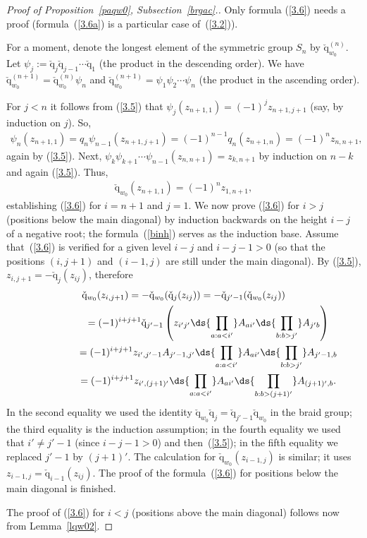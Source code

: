 \documentclass[pdftex]{sigma}
\def\nplus{\mathfrak{n}}\def\nn{\nonumber}\def\nin{\noindent}
\def\q{\check{\mathrm q}}\def\Q{\mathrm{Q}}\def\r#1{(\ref{#1})}\let\rf=\r
\def\s{z}\def\S{\mathrm {S}}\def\si{\sigma}\def\Sp{\S^{\nplus}}\def\sy{\acute{\sigma}}\def\th{\mathring{h}}
\def\tphi{A}\def\tpsi{A'}\def\tphiplus{B}\def\tpsiminus{B'}\def\ttphi{B}\def\ttpsi{B'}\def\ts{\hskip1pt}\def\tts{\hskip.5pt}
\numberwithin{equation}{section}
\begin{document}
\begin{proof}[Proof  of Proposition~\ref{paqw0}, Subsection~\ref{brgac}.] %
Only formula \rf{3.6} needs a proof (formula~\rf{3.6a}
is a particular case of~\rf{3.2}).


For a moment, denote the longest element
of the symmetric group $S_n$ by $\q_{w_0}^{(n)}$. Let $\psi_j:=\q_j\q_{j-1}\cdots\q_1$ (the product in the descending order).
We have $\q_{w_0}^{(n+1)}=\q_{w_0}^{(n)}\psi_n$ and  $\q_{w_0}^{(n+1)}=\psi_1\psi_2\cdots\psi_n$ (the product in the
ascending order).


For $j<n$ it follows from \rf{3.5} that $\psi_j (\s_{n+1,1})=(-1)^j\s_{n+1,j+1}$ (say, by induction on $j$). So,
\begin{gather*}\psi_n(\s_{n+1,1})=q_n\psi_{n-1} (\s_{n+1,j+1})=(-1)^{n-1}q_n(\s_{n+1,n})=(-1)^{n}\s_{n,n+1}  ,\end{gather*}
again by \rf{3.5}. Next, $\psi_k\psi_{k+1}\cdots\psi_{n-1}(\s_{n,n+1})=\s_{k,n+1}$ by induction on $n-k$ and
again \rf{3.5}. Thus,
\begin{gather}\label{binh}
\q_{w_0}(\s_{n+1,1})=(-1)^n \s_{1,n+1} ,
\end{gather}
establishing \rf{3.6} for $i=n+1$ and $j=1$. We now prove \rf{3.6} for $i>j$ (positions below the main diagonal) by induction backwards
on the height $i-j$ of a negative root;  the formula~\rf{binh} serves as the induction base. Assume that~\rf{3.6}
is verif\/ied for a given level $i-j$ and $i-j-1>0$ (so that the positions $(i,j+1)$ and $(i-1,j)$ are still under the main
diagonal). By \rf{3.5}, $\s_{i,j+1}=-\q_j(\s_{ij})$, therefore
\begin{gather*}\q_{w_0}(\s_{i,j+1}) = -\q_{w_0}(\q_j(\s_{ij}))=-\q_{j'-1}(\q_{w_0}(\s_{ij})) \\
\phantom{\q_{w_0}(\s_{i,j+1})}{}  = (-1)^{i+j+1} \q_{j'-1}\left(\s_{i'j'}\ds{\prod_{a:a<i'}}\tphi_{ai'}  \ds{\prod_{b:b>j'}}\tphi_{j'b}\right)\\
\phantom{\q_{w_0}(\s_{i,j+1})}{} = (-1)^{i+j+1}\s_{i',j'-1}\tphi_{j'-1,j'}\ds{\prod_{a:a<i'}}\tphi_{ai'}  \ds{\prod_{b:b>j'}}\tphi_{j'-1,b}\\
\phantom{\q_{w_0}(\s_{i,j+1})}{} = (-1)^{i+j+1}\s_{i',(j+1)'}\ds{\prod_{a:a<i'}}\tphi_{ai'}\ds{\prod_{b:b>(j+1)'}}\tphi_{(j+1)',b}  .
\end{gather*}
In the second equality we used the identity $\q_{w_0}\q_j=\q_{j'-1}\q_{w_0}$ in the braid group; the third equality is the
induction assumption; in the fourth equality we used that $i'\neq j'-1$ (since $i-j-1>0$) and then~\rf{3.5}; in the f\/ifth equality we
replaced $j'-1$ by $(j+1)'$. The calculation for $\q_{w_0}(\s_{i-1,j})$ is similar; it uses $\s_{i-1,j}=\q_{i-1}(\s_{ij})$.
The proof of the formula~\rf{3.6} for positions below the main diagonal is f\/inished.


The proof of  \rf{3.6} for $i<j$ (positions above the main diagonal) follows now from Lem\-ma~\ref{lqw02}. %
\end{proof}
\end{document}
